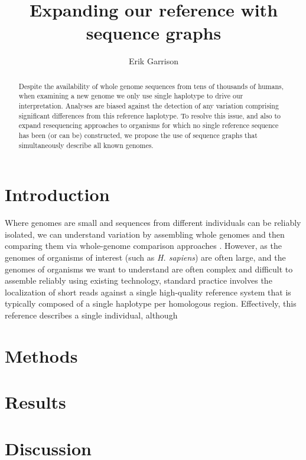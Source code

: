 \documentclass{article}
\begin{document}
\title{Expanding our reference with sequence graphs}

\author{Erik Garrison}

\maketitle

\begin{abstract}

Despite the availability of whole genome sequences from tens of thousands of humans, when examining a new genome we only use single haplotype to drive our interpretation.
Analyses are biased against the detection of any variation comprising significant differences from this reference haplotype.
To resolve this issue, and also to expand resequencing approaches to organisms for which no single reference sequence has been (or can be) constructed, we propose the use of sequence graphs that simultaneously describe all known genomes.
\end{abstract}

\section{Introduction}

Where genomes are small and sequences from different individuals can be reliably isolated, we can understand variation by assembling whole genomes and then comparing them via whole-genome comparison approaches \cite{mummer}.
However, as the genomes of organisms of interest (such as \emph{H. sapiens}) are often large, and the genomes of organisms we want to understand are often complex and difficult to assemble reliably using existing technology, standard practice involves the localization of short reads against a single high-quality reference system that is typically composed of a single haplotype per homologous region. Effectively, this reference describes a single individual, although 


\section{Methods}

\section{Results}

\section{Discussion}

{}


\end{document}
